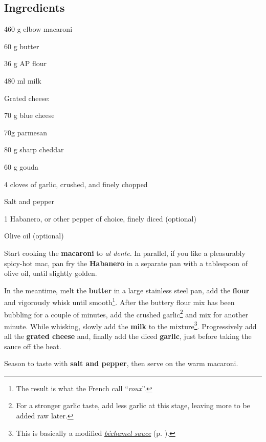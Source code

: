 \newpage
{}

\subsection*{Ingredients}
\begin{ingredients}
	\item 460 g elbow macaroni
	\item 60 g butter
	\item 36 g AP flour
	\item 480 ml milk
	\item Grated cheese: 
	\begin{ingredients}
		\item 70 g blue cheese
		\item 70g parmesan
		\item 80 g sharp cheddar
		\item 60 g gouda
	\end{ingredients}
	\item 4 cloves of garlic,  crushed, and  finely chopped
	\item Salt and pepper
	\item 1 Habanero, or other pepper of choice, finely diced (optional) 
	\item Olive oil (optional)
\end{ingredients}

\medskip

Start cooking the \textbf{macaroni} to \textit{al dente}.
In parallel, if you like a pleasurably spicy-hot mac, pan fry the \textbf{Habanero} in a separate pan with a tablespoon of olive oil, until slightly golden. 

In the meantime, melt the \textbf{butter} in a large stainless steel pan, add the \textbf{flour} and vigorously whisk until smooth\footnote{The result is what the French call ``\textit{roux}''.}. 
After the buttery flour mix has been bubbling for a couple of minutes, add the crushed garlic\footnote{For a stronger garlic taste, add less garlic at this stage, leaving more to be added raw later.} and mix for another minute.
While whisking, slowly add the \textbf{milk} to the mixture\footnote{This is basically a modified \hyperref[sauce_bechamel]{\textit{béchamel sauce}} (p. \pageref{sauce_bechamel}).}.
Progressively add all the \textbf{grated cheese} and, finally add the diced \textbf{garlic}, just before taking the sauce off the heat.

Season to taste with \textbf{salt and pepper}, then serve on the warm macaroni.

\vspace*{0.75 cm}

\begin{recipeblock}
	
\end{recipeblock}